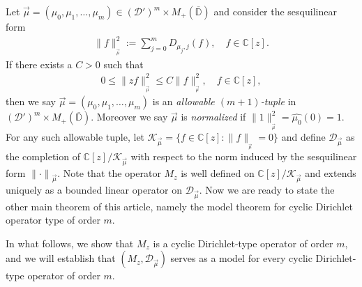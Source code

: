 \documentclass[10pt,oneside,reqno]{amsart}
\theoremstyle{definition}
\theoremstyle{remark}
\newcommand{\D}{\mathbb D}
\numberwithin{equation}{section}
\begin{document}
Let $\overrightarrow{\mu}= (\mu_0,\mu_1,\ldots,\mu_{m})\in (\mathcal D')^{m}\times M_+(\overline{\D})$ and consider the sesquilinear form 
\begin{align*}
    \|f\|^2_{_{\overrightarrow{\mu}}}:= \sum\limits_{j=0}^{m} D_{\mu_j,j}(f), \quad f\in \mathbb C[z].
\end{align*}
If there exists a $C>0$ such that 
\begin{align}\label{allowable}
 0 \leqslant  \|zf\|^2_{_{\overrightarrow{\mu}}}  \leqslant C  \|f\|^2_{_{\overrightarrow{\mu}}},\quad f\in \mathbb C[z],
\end{align}
then we say  $\overrightarrow{\mu}= (\mu_0,\mu_1,\ldots,\mu_{m})$ is an \textit{allowable $(m+1)$-tuple} in $(\mathcal D')^{m}\times M_+(\overline{\D})$. Moreover we say $\overrightarrow{\mu}$ is \textit{normalized} if $\|1\|^2_{_{\overrightarrow{\mu}}}= \hat{\mu_0}(0)=1.$ For any such  allowable tuple, let $\mathcal K_{\overrightarrow{\mu}}= \{f\in \mathbb C[z]: \|f\|_{_{\overrightarrow{\mu}}} =0\}$ and define $\mathscr D_{\overrightarrow{\mu}}$ as the completion of $\mathbb C[z]/\mathcal K_{\overrightarrow{\mu}}$ with respect to the norm induced by the sesquilinear form $\|\cdot\|{_{\overrightarrow{\mu}}}.$ Note that the operator $M_z$ is well defined on  $\mathbb C[z]/\mathcal K_{\overrightarrow{\mu}}$ and extends uniquely as a bounded linear operator on  $\mathscr D_{\overrightarrow{\mu}}.$ Now we are ready to state the other main theorem of this article, namely the model theorem for cyclic  Dirichlet operator type of order $m.$  

In what follows, we show that $M_z$ is a cyclic Dirichlet-type operator of order $m,$ and we will establish that $(M_z,\mathscr D_{\overrightarrow{\mu}})$ serves as a model for every cyclic Dirichlet-type operator of order $m.$
\end{document}
